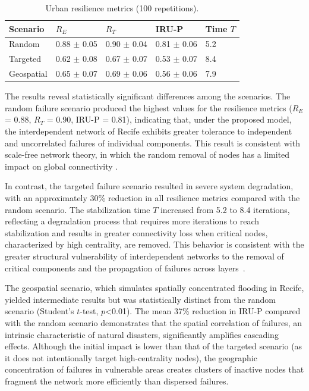 \documentclass[journal]{IEEEtran}
\begin{document}
\begin{table}[h]
\caption{Urban resilience metrics (100 repetitions).}
\label{tab:metrics}
\begin{tabular}{l p{1.35cm}  p{1.35cm}  p{1.35cm}  p{1.35cm} }
\toprule
Scenario & $R_E$ & $R_T$ & IRU-P & Time $T$ \\
\midrule
Random     & 0.88 $\pm$ 0.05 & 0.90 $\pm$ 0.04 & 0.81 $\pm$ 0.06 & 5.2 \\
Targeted   & 0.62 $\pm$ 0.08 & 0.67 $\pm$ 0.07 & 0.53 $\pm$ 0.07 & 8.4 \\
Geospatial & 0.65 $\pm$ 0.07 & 0.69 $\pm$ 0.06 & 0.56 $\pm$ 0.06 & 7.9 \\
\bottomrule
\end{tabular}
\end{table}

The results reveal statistically significant differences among the scenarios. The random failure scenario produced the highest values for the resilience metrics ($R_E$ = 0.88, $R_T$ = 0.90, IRU-P = 0.81), indicating that, under the proposed model, the interdependent network of Recife exhibits greater tolerance to independent and uncorrelated failures of individual components. This result is consistent with scale-free network theory, in which the random removal of nodes has a limited impact on global connectivity \cite{albert2000}.

In contrast, the targeted failure scenario resulted in severe system degradation, with an approximately 30\% reduction in all resilience metrics compared with the random scenario. The stabilization time $T$ increased from 5.2 to 8.4 iterations, reflecting a degradation process that requires more iterations to reach stabilization and results in greater connectivity loss when critical nodes, characterized by high centrality, are removed. This behavior is consistent with the greater structural vulnerability of interdependent networks to the removal of critical components and the propagation of failures across layers~\cite{buldyrev2010}.

The geospatial scenario, which simulates spatially concentrated flooding in Recife, yielded intermediate results but was statistically distinct from the random scenario (Student's $t$-test, $p$<0.01). The mean 37\% reduction in IRU-P compared with the random scenario demonstrates that the spatial correlation of failures, an intrinsic characteristic of natural disasters, significantly amplifies cascading effects. Although the initial impact is lower than that of the targeted scenario (as it does not intentionally target high-centrality nodes), the geographic concentration of failures in vulnerable areas creates clusters of inactive nodes that fragment the network more efficiently than dispersed failures.
\end{document}
